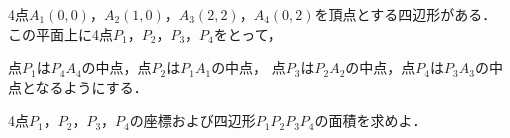 \documentclass[../../main.tex]{subfiles}
\begin{document}
4点$A_1(0,0)$，$A_2(1,0)$，$A_3(2,2)$，$A_4(0,2)$を頂点とする四辺形がある．
この平面上に4点$P_1$，$P_2$，$P_3$，$P_4$をとって，

点$P_1$は$P_4A_4$の中点，点$P_2$は$P_1A_1$の中点，
点$P_3$は$P_2A_2$の中点，点$P_4$は$P_3A_3$の中点となるようにする．

4点$P_1$，$P_2$，$P_3$，$P_4$の座標および四辺形$P_1P_2P_3P_4$の面積を求めよ．
\end{document}
